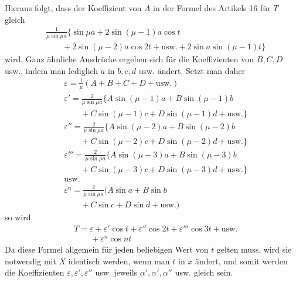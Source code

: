 Hieraus folgt, dass der Koeffizient von $A$ in der Formel des Artikels 16 für $T$ gleich
\[
\begin{aligned}
&\frac1{\mu\sin\mu a}\{\sin\mu a+2\sin(\mu-1)a\cos t\\[5pt]
&\qquad{}+2\sin(\mu-2)a\cos2t+\text{usw.}+2\sin a\sin(\mu-1)t\}
\end{aligned}
\]
wird. Ganz ähnliche Ausdrücke ergeben sich für die Koeffizienten von $B,C,D$ usw., indem man lediglich $a$ in $b,c,d$ usw. ändert. Setzt man daher
\[
\begin{aligned}
&\varepsilon=\frac1\mu(A+B+C+D+\text{usw.})\\[5pt]
&\varepsilon'=\frac2{\mu\sin\mu a}\{A\sin(\mu-1)a+B\sin(\mu-1)b\\[5pt]
&\qquad{}+C\sin(\mu-1)c+D\sin(\mu-1)d+\text{usw.}\}\\[5pt]
&\varepsilon''=\frac2{\mu\sin\mu a}\{A\sin(\mu-2)a+B\sin(\mu-2)b\\[5pt]
&\qquad{}+C\sin(\mu-2)c+D\sin(\mu-2)d+\text{usw.}\}\\[5pt]
&\varepsilon'''=\frac2{\mu\sin\mu a}\{A\sin(\mu-3)a+B\sin(\mu-3)b\\[5pt]
&\qquad{}+C\sin(\mu-3)c+D\sin(\mu-3)d+\text{usw.}\}\\[5pt]
&\text{usw.}\\[5pt]
&\varepsilon^{n}=\frac2{\mu\sin\mu a}(A\sin a+B\sin b\\[5pt]
&\qquad{}+C\sin c+D\sin d+\text{usw.})
\end{aligned}
\]
so wird
\[
\begin{aligned}
&T=\varepsilon+\varepsilon'\cos t+\varepsilon''\cos2t+\varepsilon'''\cos3t+\text{usw.}\\[5pt]
&\qquad{}+\varepsilon^{n}\cos nt
\end{aligned}
\]
Da diese Formel allgemein für jeden beliebigen Wert von $t$ gelten muss, wird sie notwendig mit $X$ identisch werden, wenn man $t$ in $x$ ändert, und somit werden die Koeffizienten $\varepsilon,\varepsilon',\varepsilon''$ usw. jeweils $\alpha',\alpha',\alpha''$ usw. gleich sein.
\endgroup
